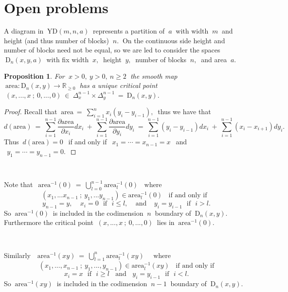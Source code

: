 \documentclass[10pt,leqeq]{article}
\newtheorem{prop}[thm]{Proposition} %
\begin{document}
\section{Open problems}



A diagram in $ \  \mathrm{YD}(m,n,a) \ $ represents a partition of $ \ a \ $ with
width  $\ m \ $  and  height (and thus number of blocks) $\ n. \ $ On the continuous side height and number of blocks need not be equal, so we are led to consider the spaces $\ \mathrm{D}_n(x,y,a) \ $ with fix width $\ x, \ $ height $\ y,\ $ number of blocks $\ n, \ $ and area $\ a.$\\

\begin{prop}
{\em For $\ x>0, \ y>0,\ n\geq 2 \ $ the smooth map 
$\ \mathrm{area}: \mathrm{D}_n(x,y) \longrightarrow \mathbb{R}_{\geq 0}\ $
has a unique critical point 
$\ (x,..., x \ ; \ 0, ..., 0) \ \in \ \Delta^{n-1}_x \times \Delta^{n-1}_y 
\ = \ \mathrm{D}_n(x,y).$
  
}
\end{prop} 

\begin{proof}
Recall that $\  \mathrm{area} \ = \ \sum_{i=1}^nx_i(y_i-y_{i-1}),\  $
thus we have that
$$d(\mathrm{area}) \ = \ \sum_{i=1}^{n-1}\frac{\partial \mathrm{area} }{\partial x_i}dx_i \ + \ \sum_{i=1}^{n-1}\frac{\partial \mathrm{area} }{\partial y_i}dy_i \ =  \
\sum_{i=1}^{n-1}(y_i-y_{i-1})dx_i \ + \ \sum_{i=1}^{n-1}(x_i-x_{i+1})dy_i.$$
Thus $\ d(\mathrm{area})=0 \ \ $ if and only if $ \ \ x_1=\cdots = x_{n-1}=x \ \ $ and $\ \ y_1=\cdots = y_{n-1}=0. \ $
\end{proof} 
 
\
 
Note that  $\ \ \mathrm{area}^{-1}(0)\ = \ \bigcup_{l=0}^{n-1} \mathrm{area}_l^{-1}(0) \ \ \ \  \mbox{where} \ \ $  $$(x_1,...x_{n-1}\ ; \ y_1,...y_{n-1}) \in \mathrm{area}_l^{-1}(0) \ \ \ \ \mbox{if and only if} \ \ \ $$
$$y_{n-1}=y, \ \ \ \  \ x_i=0 \ \ \ \mbox{if} \ \ \ i\leq l,\ \ \ \ \ \mbox{and} \ \ \ \ \ y_i=y_{i-1} \ \ \ \mbox{if} \ \ \ i>l. $$
So $\ \mathrm{area}^{-1}(0) \ $ is included in the codimension $\ n \ $ boundary of $\ \mathrm{D}_n(x,y) . \ $  Furthermore the critical point 
$\ (x,..., x \ ; \ 0, ..., 0) \ $ lies in  $ \ \mathrm{area}^{-1}(0). \ $

\

Similarly
$\ \ \ \mathrm{area}^{-1}(xy)\ = \   \bigcup_{l=1}^{n}\mathrm{area}_l^{-1}(xy) \ \ \ \ \  \   \mbox{where}  $  $$(x_1,...,x_{n-1}\ ; \ y_1,...,y_{n-1}) \in \mathrm{area}_l^{-1}(xy) \ \ \ \ \mbox{if and only if}$$
$$x_{i}=x \ \ \ \mbox{if} \ \ \ i\geq l \ \ \ \ \mbox{and} \ \ \ \ 
y_{i}=y_{i-1} \ \ \ \mbox{if} \ \ \ i< l. $$
So $\ \mathrm{area}^{-1}(xy) \ $ is included in the codimension $\ n-1 \ $ boundary of $\ \mathrm{D}_n(x,y) . \ $  
\end{document}
